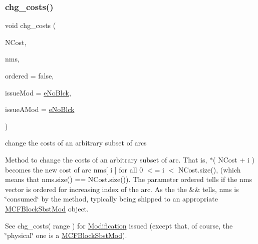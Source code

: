 \subsubsection{\texorpdfstring{chg\+\_\+costs()}{chg\_costs()}\hspace{0.1cm}{\footnotesize\ttfamily [2/2]}}
{\footnotesize\ttfamily void chg\+\_\+costs (\begin{DoxyParamCaption}\item[{\mbox{\hyperlink{class_s_m_spp__di__unipi__it_1_1_m_c_f_block_aa2211b659beb942cfb7618c11033831e}{c\+\_\+\+Vec\+\_\+\+C\+Number\+\_\+it}}}]{N\+Cost,  }\item[{\mbox{\hyperlink{class_s_m_spp__di__unipi__it_1_1_m_c_f_block_a9a1284953e2aa5222b5867c0a7f98499}{Vec\+\_\+\+Index}} \&\&}]{nms,  }\item[{const bool}]{ordered = {\ttfamily false},  }\item[{\mbox{\hyperlink{group___modification___t_y_p_e_s_ga544246d8c462e9a2d817c2c30797968f}{c\+\_\+\+Mod\+Param}}}]{issue\+Mod = {\ttfamily \mbox{\hyperlink{group___modification___t_y_p_e_s_gga48fddcdd03a03f49b7e389ca1ed938d4ada69e89c5f46e563d8a13cfa6830c136}{e\+No\+Blck}}},  }\item[{\mbox{\hyperlink{group___modification___t_y_p_e_s_ga544246d8c462e9a2d817c2c30797968f}{c\+\_\+\+Mod\+Param}}}]{issue\+A\+Mod = {\ttfamily \mbox{\hyperlink{group___modification___t_y_p_e_s_gga48fddcdd03a03f49b7e389ca1ed938d4ada69e89c5f46e563d8a13cfa6830c136}{e\+No\+Blck}}} }\end{DoxyParamCaption})}



change the costs of an arbitrary subset of arcs 

Method to change the costs of an arbitrary subset of arc. That is, $\ast$( N\+Cost + i ) becomes the new cost of arc nms\mbox{[} i \mbox{]} for all 0 $<$= i $<$ N\+Cost.\+size(), (which means that nms.\+size() == N\+Cost.\+size()). The parameter ordered tells if the nms vector is ordered for increasing index of the arc. As the the \&\& tells, nms is \char`\"{}consumed\char`\"{} by the method, typically being shipped to an appropriate \mbox{\hyperlink{class_s_m_spp__di__unipi__it_1_1_m_c_f_block_sbst_mod}{M\+C\+F\+Block\+Sbst\+Mod}} object.

See chg\+\_\+costs( range ) for \mbox{\hyperlink{class_s_m_spp__di__unipi__it_1_1_modification}{Modification}} issued (except that, of course, the \char`\"{}physical\char`\"{} one is a \mbox{\hyperlink{class_s_m_spp__di__unipi__it_1_1_m_c_f_block_sbst_mod}{M\+C\+F\+Block\+Sbst\+Mod}}). \mbox{\label{class_s_m_spp__di__unipi__it_1_1_m_c_f_block_a0ad2915af3702e293523fb3ac75ad599}} 
